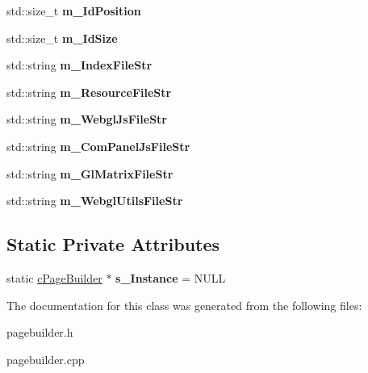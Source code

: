\begin{DoxyCompactItemize}
\item 
\hypertarget{classhttp__server_1_1cPageBuilder_a98fc3701625a6e09deb368eca4aae6da}{std\-::size\-\_\-t {\bfseries m\-\_\-\-Id\-Position}}\label{classhttp__server_1_1cPageBuilder_a98fc3701625a6e09deb368eca4aae6da}

\item 
\hypertarget{classhttp__server_1_1cPageBuilder_a2a5da5d3ab0f9f61046e2111ea36b039}{std\-::size\-\_\-t {\bfseries m\-\_\-\-Id\-Size}}\label{classhttp__server_1_1cPageBuilder_a2a5da5d3ab0f9f61046e2111ea36b039}

\item 
\hypertarget{classhttp__server_1_1cPageBuilder_a2c4b56ac0d42ba3d9d20945839082ef5}{std\-::string {\bfseries m\-\_\-\-Index\-File\-Str}}\label{classhttp__server_1_1cPageBuilder_a2c4b56ac0d42ba3d9d20945839082ef5}

\item 
\hypertarget{classhttp__server_1_1cPageBuilder_adc3bb5aec5159c7556a6012562faf9f0}{std\-::string {\bfseries m\-\_\-\-Resource\-File\-Str}}\label{classhttp__server_1_1cPageBuilder_adc3bb5aec5159c7556a6012562faf9f0}

\item 
\hypertarget{classhttp__server_1_1cPageBuilder_ab042991bd624949e0a45d62e975dacdd}{std\-::string {\bfseries m\-\_\-\-Webgl\-Js\-File\-Str}}\label{classhttp__server_1_1cPageBuilder_ab042991bd624949e0a45d62e975dacdd}

\item 
\hypertarget{classhttp__server_1_1cPageBuilder_acff93f71f4bbc839dba06b1732ea3fa2}{std\-::string {\bfseries m\-\_\-\-Com\-Panel\-Js\-File\-Str}}\label{classhttp__server_1_1cPageBuilder_acff93f71f4bbc839dba06b1732ea3fa2}

\item 
\hypertarget{classhttp__server_1_1cPageBuilder_abc5defb9eaf551d6e2b8334bb0576693}{std\-::string {\bfseries m\-\_\-\-Gl\-Matrix\-File\-Str}}\label{classhttp__server_1_1cPageBuilder_abc5defb9eaf551d6e2b8334bb0576693}

\item 
\hypertarget{classhttp__server_1_1cPageBuilder_a20f28a3a4f2a8e42f06544bdb8e22058}{std\-::string {\bfseries m\-\_\-\-Webgl\-Utils\-File\-Str}}\label{classhttp__server_1_1cPageBuilder_a20f28a3a4f2a8e42f06544bdb8e22058}

\end{DoxyCompactItemize}
\subsection*{\-Static \-Private \-Attributes}
\begin{DoxyCompactItemize}
\item 
\hypertarget{classhttp__server_1_1cPageBuilder_a5857987a8133c3768bac833850d12613}{static \hyperlink{classhttp__server_1_1cPageBuilder}{c\-Page\-Builder} $\ast$ {\bfseries s\-\_\-\-Instance} = \-N\-U\-L\-L}\label{classhttp__server_1_1cPageBuilder_a5857987a8133c3768bac833850d12613}

\end{DoxyCompactItemize}


\-The documentation for this class was generated from the following files\-:\begin{DoxyCompactItemize}
\item 
pagebuilder.\-h\item 
pagebuilder.\-cpp\end{DoxyCompactItemize}
